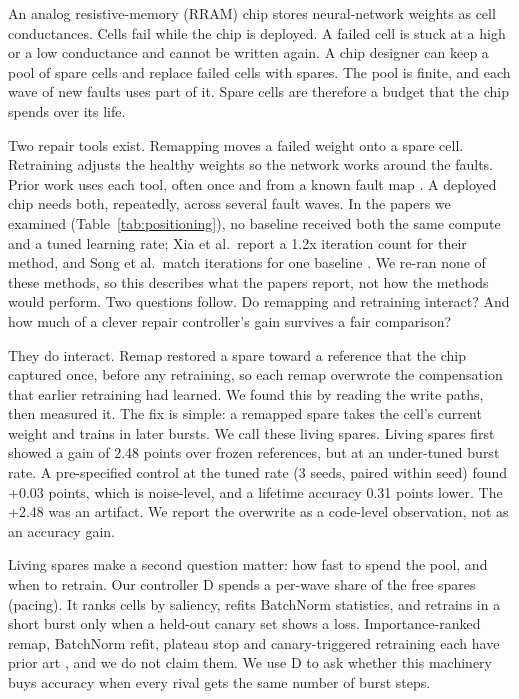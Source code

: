 \documentclass[journal]{IEEEtran}
\begin{document}
An analog resistive-memory (RRAM) chip stores neural-network weights as cell conductances.
Cells fail while the chip is deployed.
A failed cell is stuck at a high or a low conductance and cannot be written again.
A chip designer can keep a pool of spare cells and replace failed cells with spares.
The pool is finite, and each wave of new faults uses part of it.
Spare cells are therefore a budget that the chip spends over its life.

Two repair tools exist.
Remapping moves a failed weight onto a spare cell.
Retraining adjusts the healthy weights so the network works around the faults.
Prior work uses each tool, often once and from a known fault map \cite{liu17dac,chen17date,song21ittrna}.
A deployed chip needs both, repeatedly, across several fault waves.
In the papers we examined (Table~\ref{tab:positioning}), no baseline received both the same compute and a tuned learning rate; Xia et al.\ report a 1.2x iteration count for their method, and Song et al.\ match iterations for one baseline \cite{xia19tcad,song21ittrna}.
We re-ran none of these methods, so this describes what the papers report, not how the methods would perform.
Two questions follow.
Do remapping and retraining interact?
And how much of a clever repair controller's gain survives a fair comparison?

They do interact.
Remap restored a spare toward a reference that the chip captured once, before any retraining, so each remap overwrote the compensation that earlier retraining had learned.
We found this by reading the write paths, then measured it.
The fix is simple: a remapped spare takes the cell's current weight and trains in later bursts.
We call these living spares.
Living spares first showed a gain of 2.48 points over frozen references, but at an under-tuned burst rate.
A pre-specified control at the tuned rate (3 seeds, paired within seed) found +0.03 points, which is noise-level, and a lifetime accuracy 0.31 points lower.
The +2.48 was an artifact.
We report the overwrite as a code-level observation, not as an accuracy gain.

Living spares make a second question matter: how fast to spend the pool, and when to retrain.
Our controller D spends a per-wave share of the free spares (pacing).
It ranks cells by saliency, refits BatchNorm statistics, and retrains in a short burst only when a held-out canary set shows a loss.
Importance-ranked remap, BatchNorm refit, plateau stop and canary-triggered retraining each have prior art \cite{liu17dac,jung21date,li19rramedy}, and we do not claim them.
We use D to ask whether this machinery buys accuracy when every rival gets the same number of burst steps.
\end{document}
